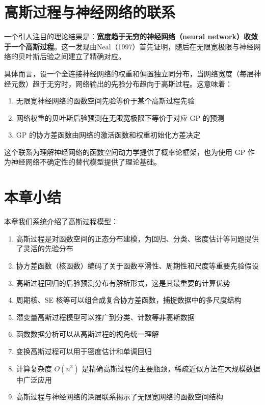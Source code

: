 \section{高斯过程与神经网络的联系}\label{sec:gp-nn-connection}

一个引人注目的理论结果是：\textbf{宽度趋于无穷的神经网络（neural network）收敛于一个高斯过程}。这一发现由Neal（1997）首先证明，随后在无限宽极限与神经网络的贝叶斯后验之间建立了精确对应。

具体而言，设一个全连接神经网络的权重和偏置独立同分布，当网络宽度（每层神经元数）趋于无穷时，网络输出的先验分布趋向于高斯过程。这意味着：

\begin{enumerate}
  \item 无限宽神经网络的函数空间先验等价于某个高斯过程先验
  \item 网络权重的贝叶斯后验预测在无限宽极限下等价于对应 GP 的预测
  \item GP 的协方差函数由网络的激活函数和权重初始化方差决定
\end{enumerate}

这个联系为理解神经网络的函数空间动力学提供了概率论框架，也为使用 GP 作为神经网络不确定性的替代模型提供了理论基础。

\section{本章小结}

本章我们系统介绍了高斯过程模型：

\begin{enumerate}
  \item 高斯过程是对函数空间的正态分布建模，为回归、分类、密度估计等问题提供了灵活的先验分布
  \item 协方差函数（核函数）编码了关于函数平滑性、周期性和尺度等重要先验假设
  \item 高斯过程回归的后验预测分布有解析形式，这是其最重要的计算优势
  \item 周期核、SE 核等可以组合成复合协方差函数，捕捉数据中的多尺度结构
  \item 潜变量高斯过程模型可以推广到分类、计数等非高斯数据
  \item 函数数据分析可以从高斯过程的视角统一理解
  \item 变换高斯过程可以用于密度估计和单调回归
  \item 计算复杂度 $O(n^3)$ 是精确高斯过程的主要瓶颈，稀疏近似方法在大规模数据中广泛应用
  \item 高斯过程与神经网络的深层联系揭示了无限宽网络的函数空间结构
\end{enumerate}

